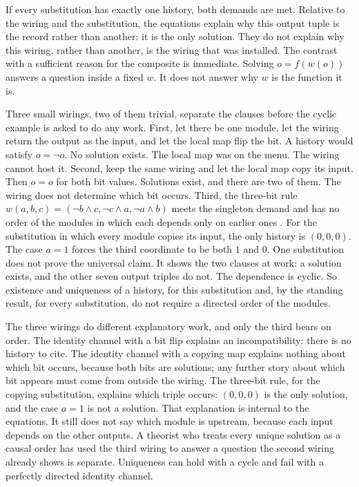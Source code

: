 \documentclass[11pt]{article}
\begin{document}
If every substitution has exactly one history, both demands are met. Relative to the wiring and the substitution, the equations explain why this output tuple is the record rather than another: it is the only solution. They do not explain why this wiring, rather than another, is the wiring that was installed. The contrast with a sufficient reason for the composite is immediate. Solving \(o=f(w(o))\) answers a question inside a fixed \(w\). It does not answer why \(w\) is the function it is.

Three small wirings, two of them trivial, separate the clauses before the cyclic example is asked to do any work. First, let there be one module, let the wiring return the output as the input, and let the local map flip the bit. A history would satisfy \(o=\lnot o\). No solution exists. The local map was on the menu. The wiring cannot host it. Second, keep the same wiring and let the local map copy its input. Then \(o=o\) for both bit values. Solutions exist, and there are two of them. The wiring does not determine which bit occurs. Third, the three-bit rule \(w(a,b,c)=(\lnot b\land c,\lnot c\land a,\lnot a\land b)\) meets the singleton demand and has no order of the modules in which each depends only on earlier ones \citep{baumeler2016,baumeler2019}. For the substitution in which every module copies its input, the only history is \((0,0,0)\). The case \(a=1\) forces the third coordinate to be both \(1\) and \(0\). One substitution does not prove the universal claim. It shows the two clauses at work: a solution exists, and the other seven output triples do not. The dependence is cyclic. So existence and uniqueness of a history, for this substitution and, by the standing result, for every substitution, do not require a directed order of the modules.

The three wirings do different explanatory work, and only the third bears on order. The identity channel with a bit flip explains an incompatibility: there is no history to cite. The identity channel with a copying map explains nothing about which bit occurs, because both bits are solutions; any further story about which bit appears must come from outside the wiring. The three-bit rule, for the copying substitution, explains which triple occurs: \((0,0,0)\) is the only solution, and the case \(a=1\) is not a solution. That explanation is internal to the equations. It still does not say which module is upstream, because each input depends on the other outputs. A theorist who treats every unique solution as a causal order has used the third wiring to answer a question the second wiring already shows is separate. Uniqueness can hold with a cycle and fail with a perfectly directed identity channel.
\end{document}

